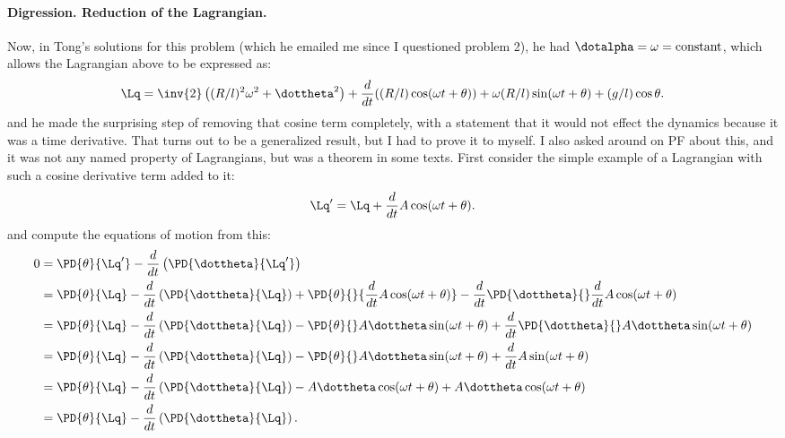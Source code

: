 {\paragraph{Digression.  Reduction of the Lagrangian.}
\label{chap:PJTongMf1:addDerivative}
%
Now, in Tong's solutions for this problem (which he emailed me since I questioned problem 2), he had \(\dotalpha = \omega = \text{constant}\), which allows the
Lagrangian above to be expressed as:
%
\begin{dmath}\label{eqn:tongMf1:1560}
\Lq =
\inv{2} \left( (R/l)^2 \omega^2 + \dottheta^2 \right)
+ \frac{d}{dt} ((R/l) \cos( \omega t + \theta )) + \omega (R/l) \sin(\omega t + \theta)
+ (g/l) \cos\theta.
\end{dmath}
%
and he made the surprising step of removing that cosine term completely, with a statement that it would not effect the dynamics because it was a time derivative.
That turns out to be a generalized result, but I had to prove it to myself.  I also asked around on PF about this, and it was not any named property of Lagrangians,
but was a theorem in some texts.
%
First consider the simple example of a Lagrangian with such a cosine derivative term added to it:
%
\begin{equation}\label{eqn:tongMf1:1580}
\Lq' = \Lq + \frac{d}{dt} A \cos(\omega t + \theta).
\end{equation}
%
and compute the equations of motion from this:
\begin{equation}\label{eqn:tongMf1:520}
\begin{aligned}
0
&= \PD{\theta}{\Lq'} - \frac{d}{dt}\left(\PD{\dottheta}{\Lq'}\right) \\
&= \PD{\theta}{\Lq} - \frac{d}{dt}\left(\PD{\dottheta}{\Lq}\right)
+ \PD{\theta}{} {\frac{d}{dt} A \cos(\omega t + \theta)}
- \frac{d}{dt} \PD{\dottheta}{} \frac{d}{dt} A \cos(\omega t + \theta) \\
&= \PD{\theta}{\Lq} - \frac{d}{dt}\left(\PD{\dottheta}{\Lq}\right)
- \PD{\theta}{} A \dottheta \sin(\omega t + \theta) +
\frac{d}{dt} \PD{\dottheta}{} A \dottheta \sin(\omega t + \theta) \\
&= \PD{\theta}{\Lq} - \frac{d}{dt}\left(\PD{\dottheta}{\Lq}\right)
- \PD{\theta}{} A \dottheta \sin(\omega t + \theta) + \frac{d}{dt} A \sin(\omega t + \theta) \\
&= \PD{\theta}{\Lq} - \frac{d}{dt}\left(\PD{\dottheta}{\Lq}\right)
- A \dottheta \cos(\omega t + \theta) + A \dottheta \cos(\omega t + \theta) \\
&= \PD{\theta}{\Lq} - \frac{d}{dt}\left(\PD{\dottheta}{\Lq}\right)  .

\end{aligned}
\end{equation}}
